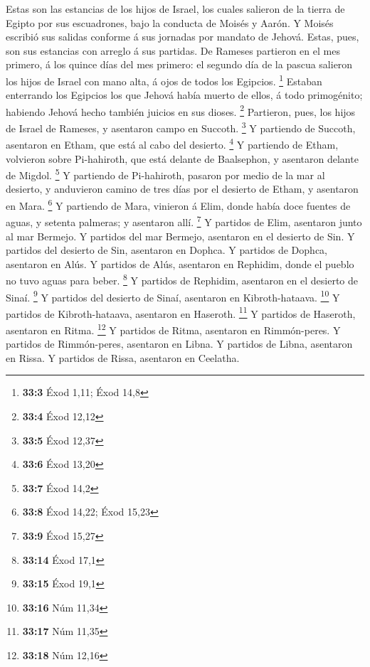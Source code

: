  Estas son las estancias de los hijos de Israel, los
cuales salieron de la tierra de Egipto por sus escuadrones, bajo la
conducta de Moisés y Aarón.  Y Moisés escribió sus salidas
conforme á sus jornadas por mandato de Jehová. Estas, pues, son sus
estancias con arreglo á sus partidas.  De Rameses
partieron en el mes primero, á los quince días del mes primero: el
segundo día de la pascua salieron los hijos de Israel con mano alta, á
ojos de todos los Egipcios. \footnote{\textbf{33:3} Éxod 1,11; Éxod 14,8}
 Estaban enterrando los Egipcios los que Jehová había
muerto de ellos, á todo primogénito; habiendo Jehová hecho también
juicios en sus dioses. \footnote{\textbf{33:4} Éxod 12,12}
 Partieron, pues, los hijos de Israel de Rameses, y
asentaron campo en Succoth. \footnote{\textbf{33:5} Éxod 12,37}
 Y partiendo de Succoth, asentaron en Etham, que está al
cabo del desierto. \footnote{\textbf{33:6} Éxod 13,20}  Y
partiendo de Etham, volvieron sobre Pi-hahiroth, que está delante de
Baalsephon, y asentaron delante de Migdol. \footnote{\textbf{33:7} Éxod
  14,2}  Y partiendo de Pi-hahiroth, pasaron por medio de
la mar al desierto, y anduvieron camino de tres días por el desierto de
Etham, y asentaron en Mara. \footnote{\textbf{33:8} Éxod 14,22; Éxod
  15,23}  Y partiendo de Mara, vinieron á Elim, donde
había doce fuentes de aguas, y setenta palmeras; y asentaron allí.
\footnote{\textbf{33:9} Éxod 15,27}  Y partidos de Elim,
asentaron junto al mar Bermejo.  Y partidos del mar
Bermejo, asentaron en el desierto de Sin.  Y partidos del
desierto de Sin, asentaron en Dophca.  Y partidos de
Dophca, asentaron en Alús.  Y partidos de Alús, asentaron
en Rephidim, donde el pueblo no tuvo aguas para beber. \footnote{\textbf{33:14}
  Éxod 17,1}  Y partidos de Rephidim, asentaron en el
desierto de Sinaí. \footnote{\textbf{33:15} Éxod 19,1}  Y
partidos del desierto de Sinaí, asentaron en Kibroth-hataava.
\footnote{\textbf{33:16} Núm 11,34}  Y partidos de
Kibroth-hataava, asentaron en Haseroth. \footnote{\textbf{33:17} Núm
  11,35}  Y partidos de Haseroth, asentaron en Ritma.
\footnote{\textbf{33:18} Núm 12,16}  Y partidos de Ritma,
asentaron en Rimmón-peres.  Y partidos de Rimmón-peres,
asentaron en Libna.  Y partidos de Libna, asentaron en
Rissa.  Y partidos de Rissa, asentaron en Ceelatha.
